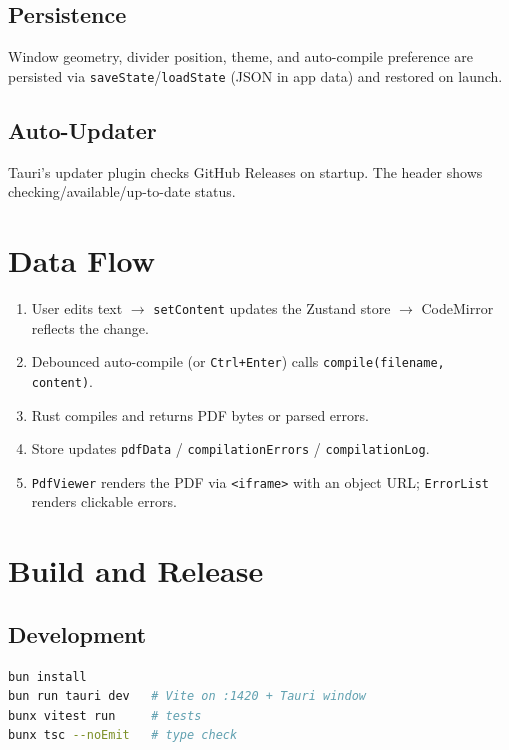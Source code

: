 \documentclass[11pt,a4paper]{report}
\begin{document}
\section{Persistence}
Window geometry, divider position, theme, and auto-compile preference are persisted via \texttt{saveState}/\texttt{loadState} (JSON in app data) and restored on launch.

\section{Auto-Updater}
Tauri's updater plugin checks GitHub Releases on startup. The header shows checking/available/up-to-date status.

\chapter{Data Flow}

\begin{enumerate}
  \item User edits text $\rightarrow$ \texttt{setContent} updates the Zustand store $\rightarrow$ CodeMirror reflects the change.
  \item Debounced auto-compile (or \texttt{Ctrl+Enter}) calls \texttt{compile(filename, content)}.
  \item Rust compiles and returns PDF bytes or parsed errors.
  \item Store updates \texttt{pdfData} / \texttt{compilationErrors} / \texttt{compilationLog}.
  \item \texttt{PdfViewer} renders the PDF via \texttt{<iframe>} with an object URL; \texttt{ErrorList} renders clickable errors.
\end{enumerate}

\chapter{Build and Release}

\section{Development}
\begin{lstlisting}[language=bash]
bun install
bun run tauri dev   # Vite on :1420 + Tauri window
bunx vitest run     # tests
bunx tsc --noEmit   # type check
\end{lstlisting}
\end{document}

